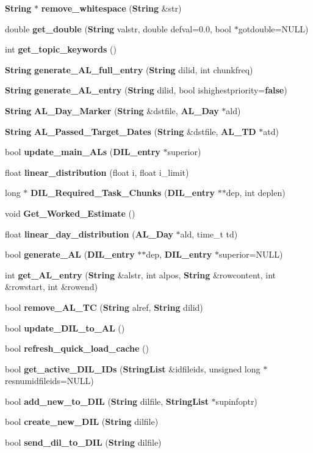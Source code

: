 \begin{CompactItemize}
{\bf String} $\ast$ {\bf remove\_\-whitespace} ({\bf String} \&str)
\item 
double {\bf get\_\-double} ({\bf String} valstr, double defval=0.0, bool $\ast$gotdouble=NULL)
\item 
int {\bf get\_\-topic\_\-keywords} ()
\item 
{\bf String} {\bf generate\_\-AL\_\-full\_\-entry} ({\bf String} dilid, int chunkfreq)
\item 
{\bf String} {\bf generate\_\-AL\_\-entry} ({\bf String} dilid, bool ishighestpriority={\bf false})
\item 
{\bf String} {\bf AL\_\-Day\_\-Marker} ({\bf String} \&dstfile, {\bf AL\_\-Day} $\ast$ald)
\item 
{\bf String} {\bf AL\_\-Passed\_\-Target\_\-Dates} ({\bf String} \&dstfile, {\bf AL\_\-TD} $\ast$atd)
\item 
bool {\bf update\_\-main\_\-ALs} ({\bf DIL\_\-entry} $\ast$superior)
\item 
float {\bf linear\_\-distribution} (float i, float i\_\-limit)
\item 
long $\ast$ {\bf DIL\_\-Required\_\-Task\_\-Chunks} ({\bf DIL\_\-entry} $\ast$$\ast$dep, int deplen)
\item 
void {\bf Get\_\-Worked\_\-Estimate} ()
\item 
float {\bf linear\_\-day\_\-distribution} ({\bf AL\_\-Day} $\ast$ald, time\_\-t td)
\item 
bool {\bf generate\_\-AL} ({\bf DIL\_\-entry} $\ast$$\ast$dep, {\bf DIL\_\-entry} $\ast$superior=NULL)
\item 
int {\bf get\_\-AL\_\-entry} ({\bf String} \&alstr, int alpos, {\bf String} \&rowcontent, int \&rowstart, int \&rowend)
\item 
bool {\bf remove\_\-AL\_\-TC} ({\bf String} alref, {\bf String} dilid)
\item 
bool {\bf update\_\-DIL\_\-to\_\-AL} ()
\item 
bool {\bf refresh\_\-quick\_\-load\_\-cache} ()
\item 
bool {\bf get\_\-active\_\-DIL\_\-IDs} ({\bf String\-List} \&idfileids, unsigned long $\ast$resnumidfileids=NULL)
\item 
bool {\bf add\_\-new\_\-to\_\-DIL} ({\bf String} dilfile, {\bf String\-List} $\ast$supinfoptr)
\item 
bool {\bf create\_\-new\_\-DIL} ({\bf String} dilfile)
\item 
bool {\bf send\_\-dil\_\-to\_\-DIL} ({\bf String} dilfile)
\item 

\end{CompactItemize}
